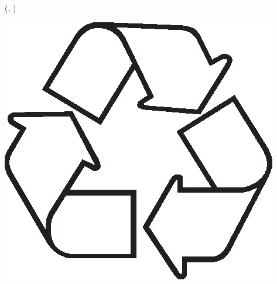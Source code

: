 \begin{textblock*}{\Wii}(\StartX -1.6cm, \StartY -2.4cm) %
  \noindent
  {%
    \begin{minipage}[c][\Hii - 2\fboxsep][c]{\linewidth - 2\fboxsep}%
      \centering%
\includegraphics[width=0.2\linewidth]{pics/recycling.eps}\par
    \end{minipage}}%
\end{textblock*} %